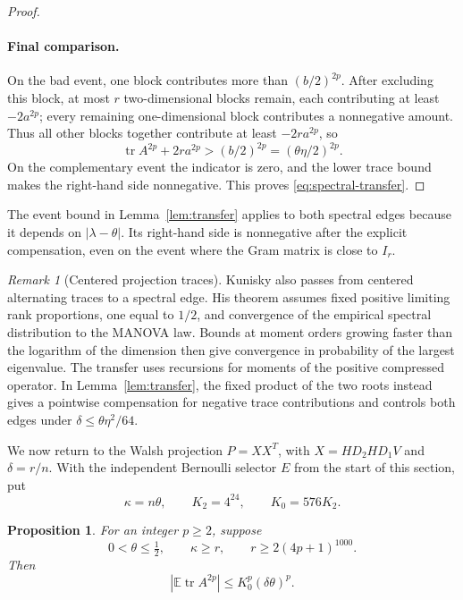 \documentclass[11pt]{article}
\newtheorem{proposition}[theorem]{Proposition}
\theoremstyle{definition}
\theoremstyle{remark}
\newtheorem*{remark}{Remark}
\theoremstyle{plain}
\newcommand{\E}{\mathbb E}
\DeclareMathOperator{\tr}{tr}
\begin{document}
\begin{proof}
\paragraph{Final comparison.}
On the bad event, one block contributes more than \((b/2)^{2p}\).
After excluding this block, at most \(r\) two-dimensional blocks
remain, each contributing at least \(-2a^{2p}\); every remaining
one-dimensional block contributes a nonnegative amount.
Thus all other blocks together contribute at least \(-2ra^{2p}\),
so
\[
 \tr A^{2p}+2ra^{2p}>(b/2)^{2p}=(\theta\eta/2)^{2p}.
\]
On the complementary event the indicator is zero, and the lower
trace bound makes the right-hand side nonnegative.
This proves \eqref{eq:spectral-transfer}.
\end{proof}

The event bound in Lemma~\ref{lem:transfer} applies to both spectral
edges because it depends on $|\lambda-\theta|$. Its right-hand side
is nonnegative after the explicit compensation, even on the event
where the Gram matrix is close to $I_r$.

\begin{remark}[Centered projection traces]
Kunisky \cite[Theorem~1.12 and Sections~4--5]{kunisky_manova}
also passes from centered alternating traces to a spectral edge.
His theorem assumes fixed positive limiting rank proportions, one
equal to $1/2$, and convergence of the empirical spectral distribution
to the MANOVA law. Bounds at moment orders growing faster than the
logarithm of the dimension then give convergence in probability of the largest
eigenvalue. The transfer uses recursions for moments of the positive
compressed operator. In Lemma~\ref{lem:transfer}, the fixed product
of the two roots instead gives a pointwise compensation for negative
trace contributions and controls both edges under
$\delta\le\theta\eta^2/64$.
\end{remark}

We now return to the Walsh projection $P=XX^T$, with
$X=HD_2HD_1V$ and $\delta=r/n$. With the independent Bernoulli
selector $E$ from the start of this section, put
\[
 \kappa=n\theta,\qquad K_2=4^{24},\qquad K_0=576K_2.
\]
\begin{proposition}\label{prop:trace}
For an integer \(p\ge2\), suppose
\begin{equation}\label{eq:trace-hypotheses}
 0<\theta\le\tfrac12,\qquad \kappa\ge r,\qquad
                         r\ge2(4p+1)^{1000}.
\end{equation}
Then
\begin{equation}\label{eq:trace-bound}
                  \left|\E\tr A^{2p}\right|
                           \le K_0^p(\delta\theta)^p.
\end{equation}
\end{proposition}
\end{document}
